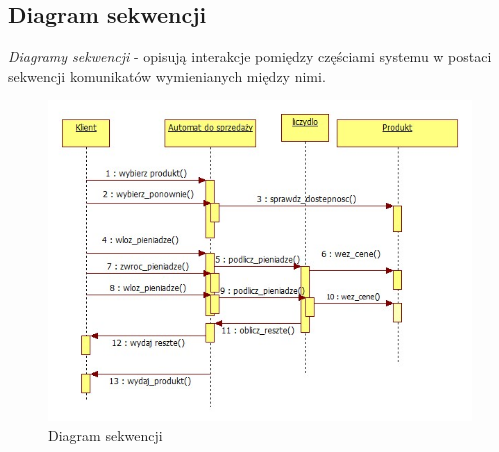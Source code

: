 \documentclass[a4paper, 11pt]{article}
\begin{document}
\newpage
\subsection{Diagram sekwencji}
\emph{Diagramy sekwencji} - opisują interakcje pomiędzy częściami systemu w postaci sekwencji komunikatów wymienianych między nimi.\\[1cm] 
\begin{figure}[ht]
\centerline{\includegraphics[scale=0.8]{sekwencje}}
\caption{Diagram sekwencji}
\end{figure}

%
%
\end{document}
